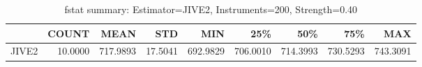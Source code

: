 \begin{table}[ht]
\centering
\caption{fstat summary: Estimator=JIVE2, Instruments=200, Strength=0.40}
\begin{tabular}{lrrrrrrrr}
\toprule
 & COUNT & MEAN & STD & MIN & 25\% & 50\% & 75\% & MAX \\
\midrule
JIVE2 & 10.0000 & 717.9893 & 17.5041 & 692.9829 & 706.0010 & 714.3993 & 730.5293 & 743.3091 \\
\bottomrule
\end{tabular}
\end{table}
